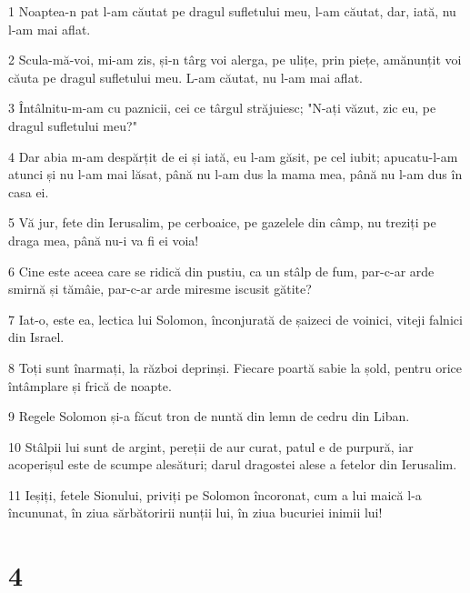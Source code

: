 \par 1 Noaptea-n pat l-am căutat pe dragul sufletului meu, l-am căutat, dar, iată, nu l-am mai aflat.
\par 2 Scula-mă-voi, mi-am zis, și-n târg voi alerga, pe ulițe, prin piețe, amănunțit voi căuta pe dragul sufletului meu. L-am căutat, nu l-am mai aflat.
\par 3 Întâlnitu-m-am cu paznicii, cei ce târgul străjuiesc; "N-ați văzut, zic eu, pe dragul sufletului meu?"
\par 4 Dar abia m-am despărțit de ei și iată, eu l-am găsit, pe cel iubit; apucatu-l-am atunci și nu l-am mai lăsat, până nu l-am dus la mama mea, până nu l-am dus în casa ei.
\par 5 Vă jur, fete din Ierusalim, pe cerboaice, pe gazelele din câmp, nu treziți pe draga mea, până nu-i va fi ei voia!
\par 6 Cine este aceea care se ridică din pustiu, ca un stâlp de fum, par-c-ar arde smirnă și tămâie, par-c-ar arde miresme iscusit gătite?
\par 7 Iat-o, este ea, lectica lui Solomon, înconjurată de șaizeci de voinici, viteji falnici din Israel.
\par 8 Toți sunt înarmați, la război deprinși. Fiecare poartă sabie la șold, pentru orice întâmplare și frică de noapte.
\par 9 Regele Solomon și-a făcut tron de nuntă din lemn de cedru din Liban.
\par 10 Stâlpii lui sunt de argint, pereții de aur curat, patul e de purpură, iar acoperișul este de scumpe alesături; darul dragostei alese a fetelor din Ierusalim.
\par 11 Ieșiți, fetele Sionului, priviți pe Solomon încoronat, cum a lui maică l-a încununat, în ziua sărbătoririi nunții lui, în ziua bucuriei inimii lui!

\chapter{4}

